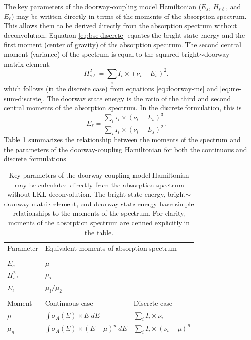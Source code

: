 The key parameters of the doorway-coupling model Hamiltonian ($E_s$,
$H_{s\ell}$, and $E_{\ell}$) may be written directly in terms of the
moments of the absorption spectrum.  This allows them to be derived
directly from the absorption spectrum without deconvolution.  Equation
\ref{eq:bse-discrete} equates the bright state energy and the first
moment (center of gravity) of the absorption spectrum.  The second
central moment (variance) of the spectrum is equal to the squared
bright$\sim$doorway matrix element,
\begin{equation}
  \label{eq:doorway-moment}
  H_{s\ell}^2 = \sum_i I_i \times (\nu_i - E_s)^2.
\end{equation}
which follows (in the discrete case) from equations
\ref{eq:doorway-me} and \ref{eq:me-sum-discrete}.  The doorway state
energy is the ratio of the third and second central moments of the
absorption spectrum.  In the discrete formulation, this is
\begin{equation}
  E_{\ell} = \frac{{\displaystyle \sum_i I_i \times (\nu_i - E_s)^3}}
                {{\displaystyle \sum_i I_i \times (\nu_i - E_s)^2}}.
\end{equation}
Table \ref{table:moments} summarizes the relationship between the
moments of the spectrum and the parameters of the doorway-coupling
Hamiltonian for both the continuous and discrete formulations.

\begin{table}
  \caption{Key parameters of the doorway-coupling model Hamiltonian 
    may be calculated directly from the absorption spectrum without 
    LKL deconvolution.  The bright state energy, bright$\sim$doorway
    matrix element, and doorway state energy have simple relationships
    to the moments of the spectrum.  For clarity, moments of the
    absorption spectrum are defined explicitly in the table.}
  \label{table:moments}
  \centering
  \begin{tabular}{lll}
    & \\
    \toprule
    Parameter & \multicolumn{2}{l}{Equivalent moments of absorption spectrum} \\
    \midrule
    & \\
    $E_s$ & $\mu$ \\
    $H_{s\ell}^2$ & $\mu_2$ \\
    $E_{\ell}$ & $\mu_3 / \mu_2$ \\
    & \\
    \toprule
    Moment & Continuous case & Discrete case \\
    \midrule
    $\mu$ 
      & ${\displaystyle \int \sigma_A(E) \times E \; dE}$ 
      & ${\displaystyle \sum_i I_i \times \nu_i}$ \\
    $\mu_n$ 
      & ${\displaystyle \int \sigma_A(E) \times (E - \mu)^n \; dE}$
      & ${\displaystyle \sum_i I_i \times (\nu_i - \mu)^n}$ \\
      \bottomrule
  \end{tabular}
\end{table}

